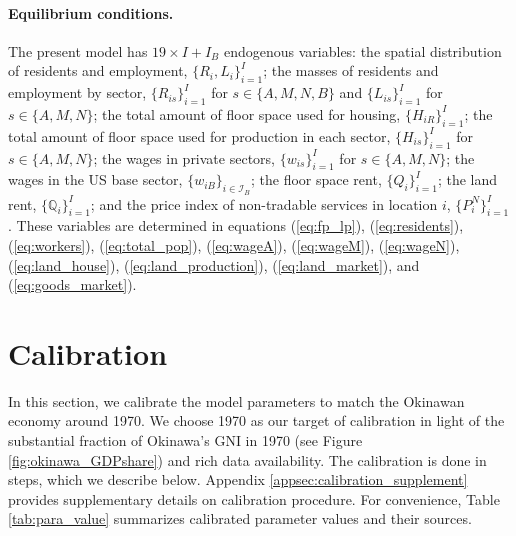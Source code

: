 \documentclass[12pt, unicode, a4paper]{article}
\newcommand{\1}{\mbox{1}\hspace{-0.25em}\mbox{l}} %
\begin{document}
\paragraph{Equilibrium conditions.}
The present model has $19 \times I+I_B$ endogenous variables: the spatial distribution of residents and employment, $\{ R_i,L_i \}_{i=1}^I$; the masses of residents and employment by sector, $\{ R_{is} \}_{i=1}^I$ for $s \in \{ A,M,N,B \}$ and $\{ L_{is} \}_{i=1}^I$ for $s \in \{ A,M,N \}$; the total amount of floor space used for housing, $\{ H_{iR} \}_{i=1}^I$; the total amount of floor space used for production in each sector, $\{ H_{is} \}_{i=1}^I$ for $s \in \{ A,M,N \}$; the wages in private sectors, $\{ w_{is} \}_{i=1}^I$ for $s \in \{ A,M,N \}$; the wages in the US base sector, $\{ w_{iB} \}_{i \in \mathcal{I}_B}$; the floor space rent, $\{ Q_i \}_{i=1}^I$;  the land rent, $\{ \mathbb{Q}_i \}_{i=1}^I$; and the price index of non-tradable services in location $i$, $\{ P_{i}^N \}_{i=1}^I$. These variables are determined in equations (\ref{eq:fp_lp}), (\ref{eq:residents}), (\ref{eq:workers}), (\ref{eq:total_pop}), (\ref{eq:wageA}), (\ref{eq:wageM}), (\ref{eq:wageN}), (\ref{eq:land_house}), (\ref{eq:land_production}), (\ref{eq:land_market}), and (\ref{eq:goods_market}).


\section{Calibration}\label{sec:calibration}

In this section, we calibrate the model parameters to match the Okinawan economy around 1970. 
We choose 1970 as our target of calibration in light of the substantial fraction of Okinawa's GNI in 1970 (see Figure \ref{fig:okinawa_GDPshare}) and rich data availability.
The calibration is done in steps, which we describe below. Appendix \ref{appsec:calibration_supplement} provides supplementary details on calibration procedure. For convenience, Table \ref{tab:para_value} summarizes calibrated parameter values and their sources.
\end{document}
